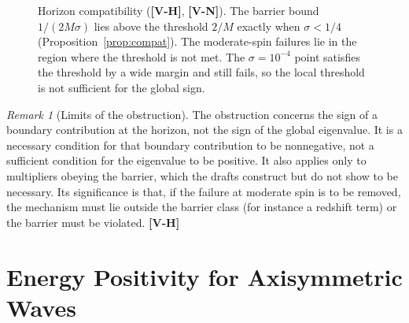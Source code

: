 \documentclass[11pt, a4paper]{article}
\newcommand{\VN}{\textcolor{vn}{\textbf{[V-N]}}}
\newcommand{\VH}{\textcolor{vh}{\textbf{[V-H]}}}
\theoremstyle{remark}
\newtheorem{remark}[theorem]{Remark}
\theoremstyle{definition}
\begin{document}
\begin{figure}[H]
\centering
{}
\caption{Horizon compatibility (\VH, \VN). The barrier bound $1/(2M\sigma)$ lies above the threshold $2/M$ exactly when $\sigma < 1/4$ (Proposition~\ref{prop:compat}). The moderate-spin failures lie in the region where the threshold is not met. The $\sigma = 10^{-4}$ point satisfies the threshold by a wide margin and still fails, so the local threshold is not sufficient for the global sign.}
\label{fig:horizon}
\end{figure}

\begin{remark}[Limits of the obstruction]
The obstruction concerns the sign of a boundary contribution at the horizon, not the sign of the global eigenvalue. It is a necessary condition for that boundary contribution to be nonnegative, not a sufficient condition for the eigenvalue to be positive. It also applies only to multipliers obeying the barrier, which the drafts construct but do not show to be necessary. Its significance is that, if the failure at moderate spin is to be removed, the mechanism must lie outside the barrier class (for instance a redshift term) or the barrier must be violated. \VH
\end{remark}

\section{Energy Positivity for Axisymmetric Waves}
\label{sec:energy}
\end{document}
